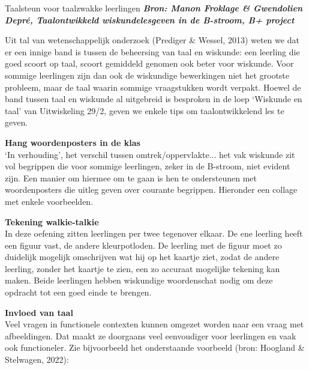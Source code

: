\begin{lesactiviteit}{Taalsteun voor taalzwakke leerlingen}
\textbf{\textit{Bron: Manon Froklage \& Gwendolien Depré, Taalontwikkeld wiskundelesgeven in de B-stroom, B+ project}}

Uit tal van wetenschappelijk onderzoek (Prediger \& Wessel, 2013) weten we dat er een innige band is tussen de beheersing van taal en wiskunde: een leerling die goed scoort op taal, scoort gemiddeld genomen ook beter voor wiskunde. Voor sommige leerlingen zijn dan ook de wiskundige bewerkingen niet het grootste probleem, maar de taal waarin sommige vraagstukken wordt verpakt. Hoewel de band tussen taal en wiskunde al uitgebreid is besproken in de loep `Wiskunde en taal' van Uitwiskeling 29/2, geven we enkele tips om taalontwikkelend les te geven.

\textbf{Hang woordenposters in de klas}\\
\noindent `In verhouding', het verschil tussen omtrek/oppervlakte... het vak wiskunde zit vol begrippen die voor sommige leerlingen, zeker in de B-stroom, niet evident zijn. Een manier om hiermee om te gaan is hen te ondersteunen met woordenposters die uitleg geven over courante begrippen. Hieronder een collage met enkele voorbeelden. \\

\textbf{Tekening walkie-talkie}\\
\noindent In deze oefening zitten leerlingen per twee tegenover elkaar. De ene leerling heeft een figuur vast, de andere kleurpotloden. De leerling met de figuur moet zo duidelijk mogelijk omschrijven wat hij op het kaartje ziet, zodat de andere leerling, zonder het kaartje te zien, een zo accuraat mogelijke tekening kan maken. Beide leerlingen hebben wiskundige woordenschat nodig om deze opdracht tot een goed einde te brengen.\\


\textbf{Invloed van taal}\\
Veel vragen in functionele contexten kunnen omgezet worden naar een vraag met afbeeldingen. Dat maakt ze doorgaans veel eenvoudiger voor leerlingen en vaak ook functioneler. Zie bijvoorbeeld het onderstaande voorbeeld (bron: Hoogland \& Stelwagen, 2022):





\end{lesactiviteit}
